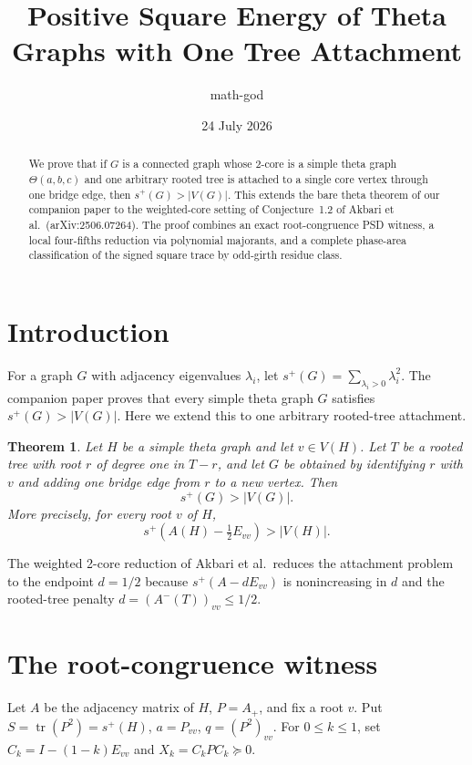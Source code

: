 \documentclass[11pt]{article}
\title{Positive Square Energy of Theta Graphs with One Tree Attachment}
\author{math-god}
\date{24 July 2026}
\newtheorem{theorem}{Theorem}
\begin{document}
\maketitle

\begin{abstract}
We prove that if $G$ is a connected graph whose 2-core is a simple theta
graph $\Theta(a,b,c)$ and one arbitrary rooted tree is attached to a single
core vertex through one bridge edge, then $s^+(G)>|V(G)|$.
This extends the bare theta theorem of our companion paper to the
weighted-core setting of Conjecture~1.2 of Akbari et al.\ (arXiv:2506.07264).
The proof combines an exact root-congruence PSD witness, a local
four-fifths reduction via polynomial majorants, and a complete phase-area
classification of the signed square trace by odd-girth residue class.
\end{abstract}

\section{Introduction}
For a graph $G$ with adjacency eigenvalues $\lambda_i$, let
$s^+(G)=\sum_{\lambda_i>0}\lambda_i^2$.
The companion paper proves that every simple theta graph $G$ satisfies
$s^+(G)>|V(G)|$.
Here we extend this to one arbitrary rooted-tree attachment.

\begin{theorem}\label{thm:weighted}
Let $H$ be a simple theta graph and let $v\in V(H)$.
Let $T$ be a rooted tree with root $r$ of degree one in $T-r$,
and let $G$ be obtained by identifying $r$ with $v$ and adding one
bridge edge from $r$ to a new vertex.
Then
\[ s^+(G)>|V(G)|. \]
More precisely, for every root $v$ of $H$,
\[ s^+\!\left(A(H)-\tfrac12 E_{vv}\right)>|V(H)|. \]
\end{theorem}

The weighted 2-core reduction of Akbari et al.\ reduces the attachment
problem to the endpoint $d=1/2$ because $s^+(A-dE_{vv})$ is nonincreasing
in $d$ and the rooted-tree penalty $d=(A^-(T))_{vv}\le 1/2$.

\section{The root-congruence witness}
Let $A$ be the adjacency matrix of $H$, $P=A_+$, and fix a root $v$.
Put $S=\operatorname{tr}(P^2)=s^+(H)$, $a=P_{vv}$, $q=(P^2)_{vv}$.
For $0\le k\le 1$, set $C_k=I-(1-k)E_{vv}$ and $X_k=C_kPC_k\succeq0$.
\end{document}
